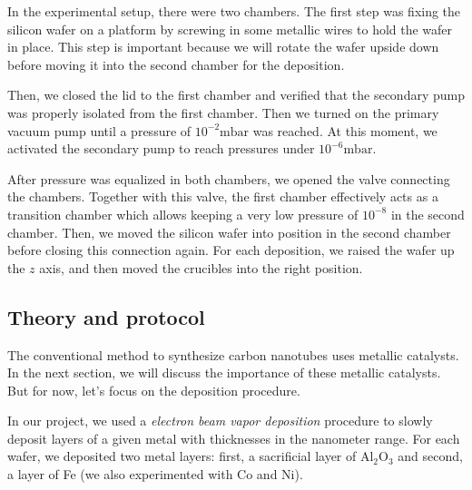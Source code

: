 \documentclass[a4paper,12pt,twoside]{article}
\begin{document}
In the experimental setup, there were two chambers. The first step was fixing the silicon wafer on a platform by screwing in some metallic wires to hold the wafer in place. This step is important because we will rotate the wafer upside down before moving it into the second chamber for the deposition.

Then, we closed the lid to the first chamber and verified that the secondary pump was properly isolated from the first chamber. Then we turned on the primary vacuum pump until a pressure of $10^{-2} \mathrm{mbar}$ was reached. At this moment, we activated the secondary pump to reach pressures under $10^{-6} \mathrm{mbar}$.

After pressure was equalized in both chambers, we opened the valve connecting the chambers. Together with this valve, the first chamber effectively acts as a transition chamber which allows keeping a very low pressure of $10^{-8}$  in the second chamber. Then, we moved the silicon wafer into position in the second chamber before closing this connection again. For each deposition, we raised the wafer up the $z$ axis, and then moved the crucibles into the right position.

\subsection{Theory and protocol}
The conventional method to synthesize carbon nanotubes uses metallic catalysts. In the next section, we will discuss the importance of these metallic catalysts. But for now, let's focus on the deposition procedure.

In our project, we used a \textit{electron beam vapor deposition} procedure to slowly deposit layers of a given metal with thicknesses in the nanometer range. For each wafer, we deposited two metal layers: first, a sacrificial layer of Al$_2$O$_3$ and second, a layer of Fe (we also experimented with Co and Ni).
\end{document}
